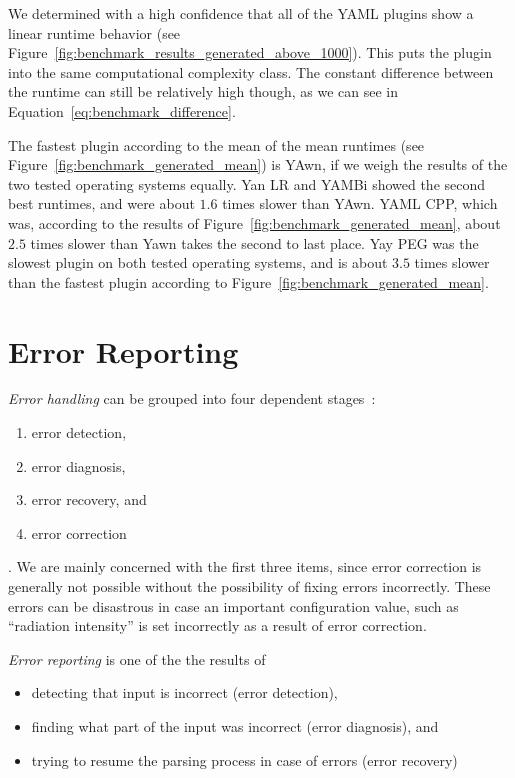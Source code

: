 We determined with a high confidence that all of the YAML plugins show a linear runtime behavior (see Figure~\ref{fig:benchmark_results_generated_above_1000}). This puts the plugin into the same computational complexity class. The constant difference between the runtime can still be relatively high though, as we can see in Equation~\ref{eq:benchmark_difference}.

The fastest plugin according to the mean of the mean runtimes (see Figure~\ref{fig:benchmark_generated_mean}) is YAwn, if we weigh the results of the two tested operating systems equally. Yan LR and YAMBi showed the second best runtimes, and were about $1.6$ times slower than YAwn. YAML CPP, which was, according to the results of Figure~\ref{fig:benchmark_generated_mean}, about $2.5$ times slower than Yawn takes the second to last place. Yay PEG was the slowest plugin on both tested operating systems, and is about $3.5$ times slower than the fastest plugin according to Figure~\ref{fig:benchmark_generated_mean}.

\section{Error Reporting}

\emph{Error handling} can be grouped into four dependent stages~\cite{ruefenacht2016error, pottier2016reachability}:

\begin{enumerate}
  \item error detection,
  \item error diagnosis,
  \item error recovery, and
  \item error correction
\end{enumerate}

. We are mainly concerned with the first three items, since error correction is generally not possible without the possibility of fixing errors incorrectly. These errors can be disastrous in case an important configuration value, such as “radiation intensity” is set incorrectly as a result of error correction.

\emph{Error reporting} is one of the the results of

\begin{itemize}
  \item detecting that input is incorrect (error detection),
  \item finding what part of the input was incorrect (error diagnosis), and
  \item trying to resume the parsing process in case of errors (error recovery)
\end{itemize}

